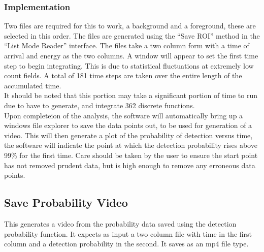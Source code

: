 \subsubsection{Implementation}
	Two files are required for this to work, a background and a foreground, these are selected in this order. The files are generated using the ``Save ROI'' method in the ``List Mode Reader'' interface. The files take a two column form with a time of arrival and energy as the two columns. A window will appear to set the first time step to begin integrating. This is due to statistical fluctuations at extremely low count fields. A total of 181 time steps are taken over the entire length of the accumulated time.\\ 
	
It should be noted that this portion may take a significant portion of time to run due to have to generate, and integrate 362 discrete functions. \\

Upon completeion of the analysis, the software will automatically bring up a windows file explorer to save the data points out, to be used for generation of a video. This will then generate a plot of the probability of detection versus time, the software will indicate the point at which the detection probability rises above 99\% for the first time. Care should be taken by the user to ensure the start point has not removed prudent data, but is high enough to remove any erroneous data points. 

\subsection{Save Probability Video}
	This generates a video from the probability data saved using the detection probability function. It expects as input a two column file with time in the first column and a detection probability in the second. It saves as an mp4 file type.



